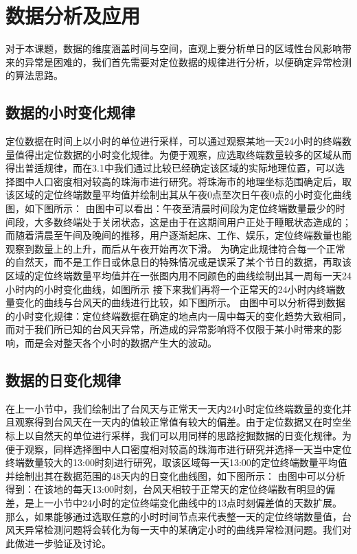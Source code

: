 \documentclass[a4paper,AutoFakeBold,oneside,12pt]{book}
\begin{document}
{{\section{数据分析及应用}
对于本课题，数据的维度涵盖时间与空间，直观上要分析单日的区域性台风影响带来的异常是困难的，我们首先需要对定位数据的规律进行分析，以便确定异常检测的算法思路。
\subsection{数据的小时变化规律}
定位数据在时间上以小时的单位进行采样，可以通过观察某地一天24小时的终端数量值得出定位数据的小时变化规律。为便于观察，应选取终端数量较多的区域从而得出普适规律，而在3.1中我们通过比较已经确定该区域的实际地理位置，可以选择图中人口密度相对较高的珠海市进行研究。将珠海市的地理坐标范围确定后，取该区域的定位终端数量平均值并绘制出其从午夜0点至次日午夜0点的小时变化曲线图，如下图所示：
	由图中可以看出：午夜至清晨时间段为定位终端数量最少的时间段，大多数终端处于关闭状态，这是由于在这期间用户正处于睡眠状态造成的；而随着清晨至午间及晚间的推移，用户逐渐起床、工作、娱乐，定位终端数量也能观察到数量上的上升，而后从午夜开始再次下滑。
	为确定此规律符合每一个正常的自然天，而不是工作日或休息日的特殊情况或是误采了某个节日的数据，再取该区域的定位终端数量平均值并在一张图内用不同颜色的曲线绘制出其一周每一天24小时内的小时变化曲线，如图所示
	接下来我们再将一个正常天的24小时内终端数量变化的曲线与台风天的曲线进行比较，如下图所示。
	由图中可以分析得到数据的小时变化规律：定位终端数据在确定的地点内一周中每天的变化趋势大致相同，而对于我们所已知的台风天异常，所造成的异常影响将不仅限于某小时带来的影响，而是会对整天各个小时的数据产生大的波动。
\subsection{数据的日变化规律}
	在上一小节中，我们绘制出了台风天与正常天一天内24小时定位终端数量的变化并且观察得到台风天在一天内的值较正常值有较大的偏差。由于定位数据又在时空坐标上以自然天的单位进行采样，我们可以用同样的思路挖掘数据的日变化规律。为便于观察，同样选择图中人口密度相对较高的珠海市进行研究并选择一天当中定位终端数量较大的13:00时刻进行研究，取该区域每一天13:00的定位终端数量平均值并绘制出其在数据范围的48天内的日变化曲线图，如下图所示：
	由图中可以分析得到：在该地的每天13:00时刻，台风天相较于正常天的定位终端数有明显的偏差，是上一小节中24小时的定位终端变化曲线中的13点时刻偏差值的天数扩展。
	那么，如果能够通过选取任意的小时时间节点来代表整一天的定位终端数量值，台风天异常检测问题将会转化为每一天中的某确定小时的曲线异常检测问题。我们对此做进一步验证及讨论。

}}
\end{document}
